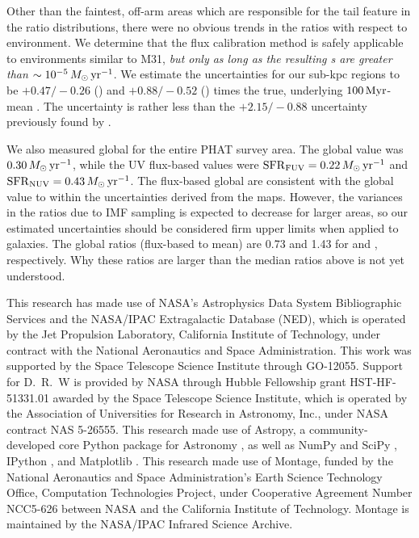 \documentclass[iop, tighten]{emulateapj}
\begin{document}
Other than the faintest, off-arm areas which are responsible for the tail
feature in the \sfr{} ratio distributions, there were no obvious trends in the
\sfr{} ratios with respect to environment. We determine that the flux
calibration method is safely applicable to environments similar to M31,
\emph{but only as long as the resulting \sfr{}s are greater than $\sim
10^{-5}\,M_\odot\,\mathrm{yr}^{-1}$}. We estimate the \sfr{} uncertainties for our sub-kpc
regions to be $+\!0.47/\!-\!0.26$ (\fuv{}) and $+\!0.88/\!-\!0.52$ (\nuv{})
times the true, underlying $100\,\mathrm{Myr}$-mean \sfr{}. The \sfrfuv{} uncertainty is
rather less than the $+\!2.15/\!-\!0.88$ uncertainty previously found by
\citet{Simones:2014}.

We also measured global  for the entire PHAT survey area. The global
\sfroneh{} value was $0.30\,M_\odot\,\mathrm{yr}^{-1}$, while the UV flux-based values were
$\mathrm{SFR}_{\mathrm{FUV}} = 0.22\,M_\odot\,\mathrm{yr}^{-1}$ and $\mathrm{SFR}_{\mathrm{NUV}} = 0.43\,M_\odot\,\mathrm{yr}^{-1}$. The flux-based
global  are consistent with the global \sfroneh{} value to within the
uncertainties derived from the \sfr{} maps. However, the variances in the
\sfr{} ratios due to IMF sampling is expected to decrease for larger areas, so
our estimated uncertainties should be considered firm upper limits when applied
to galaxies. The global \sfr{} ratios (flux-based to mean) are 0.73 and 1.43
for \fuv{} and \nuv{}, respectively. Why these ratios are larger than the
median ratios above is not yet understood.

This research has made use of NASA's Astrophysics Data System Bibliographic
Services and the NASA/IPAC Extragalactic Database (NED), which is operated by
the Jet Propulsion Laboratory, California Institute of Technology, under
contract with the National Aeronautics and Space Administration. This work was
supported by the Space Telescope Science Institute through GO-12055. Support
for D.~R.~W is provided by NASA through Hubble Fellowship grant HST-HF-51331.01
awarded by the Space Telescope Science Institute, which is operated by the
Association of Universities for Research in Astronomy, Inc., under NASA
contract NAS 5-26555. This research made use of Astropy, a community-developed
core Python package for Astronomy \citep{Astropy_Collaboration:2013}, as well
as NumPy and SciPy \citep{Oliphant:2007}, IPython \citep{Perez:2007}, and
Matplotlib \citep{Hunter:2007}. This research made use of Montage, funded by
the National Aeronautics and Space Administration's Earth Science Technology
Office, Computation Technologies Project, under Cooperative Agreement Number
NCC5-626 between NASA and the California Institute of Technology. Montage is
maintained by the NASA/IPAC Infrared Science Archive.






\end{document}
